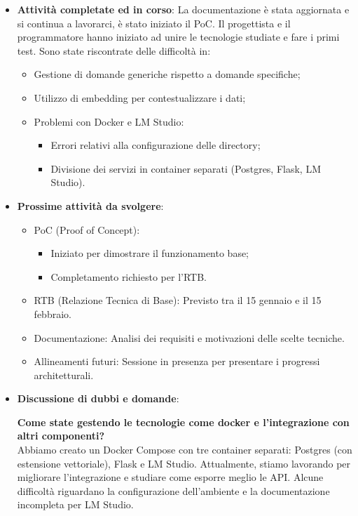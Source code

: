 \begin{itemize}
 \item \textbf{Attività completate ed in corso}: 
 La documentazione è stata aggiornata e si continua a lavorarci, \`e stato iniziato il PoC. Il progettista e il programmatore hanno iniziato ad unire le tecnologie studiate e fare i primi test.
 Sono state riscontrate delle difficoltà in:
 \begin{itemize}
        \item Gestione di domande generiche rispetto a domande specifiche;
        \item Utilizzo di embedding per contestualizzare i dati;
        \item Problemi con Docker e LM Studio:
       \begin{itemize}
                    \item Errori relativi alla configurazione delle directory;
                    \item Divisione dei servizi in container separati (Postgres, Flask, LM Studio).
        \end{itemize}  
\end{itemize}
\item \textbf{Prossime attività da svolgere}:
\begin{itemize}
        \item PoC (Proof of Concept):
         \begin{itemize}
            \item Iniziato per dimostrare il funzionamento base;
            \item Completamento richiesto per l’RTB.
        \end{itemize}
        \item RTB (Relazione Tecnica di Base): Previsto tra il 15 gennaio e il 15 febbraio.
        \item Documentazione: Analisi dei requisiti e motivazioni delle scelte tecniche.
        \item Allineamenti futuri: Sessione in presenza per presentare i progressi architetturali.

    \end{itemize}


 \item \textbf{Discussione di dubbi e domande}:


\textbf{Come state gestendo le tecnologie come docker e l'integrazione con altri componenti?}\\
Abbiamo creato un Docker Compose con tre container separati: Postgres (con estensione vettoriale), Flask e LM Studio. Attualmente, stiamo lavorando per migliorare l'integrazione e studiare come esporre meglio le API. Alcune difficoltà riguardano la configurazione dell'ambiente e la documentazione incompleta per LM Studio.\\


\end{itemize}
